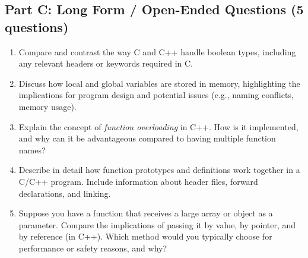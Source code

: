 \documentclass[a4paper,12pt]{article}
\begin{document}
\subsection*{Part C: Long Form / Open-Ended Questions (5 questions)}
\begin{enumerate}
    \item Compare and contrast the way C and C++ handle boolean types, including any relevant headers or keywords required in C.
    \item Discuss how local and global variables are stored in memory, highlighting the implications for program design and potential issues (e.g., naming conflicts, memory usage).
    \item Explain the concept of \textit{function overloading} in C++. How is it implemented, and why can it be advantageous compared to having multiple function names?
    \item Describe in detail how function prototypes and definitions work together in a C/C++ program. Include information about header files, forward declarations, and linking.
    \item Suppose you have a function that receives a large array or object as a parameter. Compare the implications of passing it by value, by pointer, and by reference (in C++). Which method would you typically choose for performance or safety reasons, and why?
\end{enumerate}

\newpage
\end{document}
